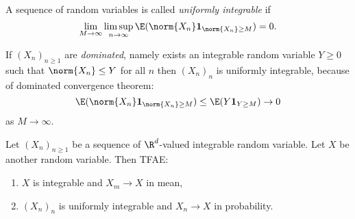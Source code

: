 \documentclass[a4paper]{article}
\begin{document}
\begin{definition}
  A sequence of random variables is called \emph{uniformly integrable} if
  \[
    \lim_{M \to \infty} \limsup_{n \to \infty} \E(\norm{X_n} \mathbf 1_{\norm{X_n} \geq M}) = 0.
  \]
\end{definition}

\begin{remark}
  If \((X_n)_{n \geq 1}\) are \emph{dominated}, namely exists an integrable random variable \(Y \geq 0\) such that \(\norm{X_n} \leq Y\) for all \(n\) then \((X_n)_n\) is uniformly integrable, because of dominated convergence theorem:
  \[
    \E(\norm{X_n} \mathbf 1_{\norm{X_n} \geq M}) \leq \E(Y \mathbf 1_{Y \geq M}) \to 0
  \]
  as \(M \to \infty\).
\end{remark}

\begin{theorem}
  Let \((X_n)_{n \geq 1}\) be a sequence of \(\R^d\)-valued integrable random variable. Let \(X\) be another random variable. Then TFAE:
  \begin{enumerate}
  \item \(X\) is integrable and \(X_m \to X\) in mean,
  \item \((X_n)_n\) is uniformly integrable and \(X_n \to X\) in probability.
  \end{enumerate}
\end{theorem}
\end{document}

